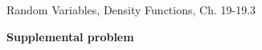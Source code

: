 \documentclass[handout]{mcs}
\begin{document}

\begin{staffnotes}
Random Variables, Density Functions, Ch. 19-19.3

\end{staffnotes}








\vspace{20mm}
\begin{center}
\textbf{\large Supplemental problem}
\end{center}










\end{document}
